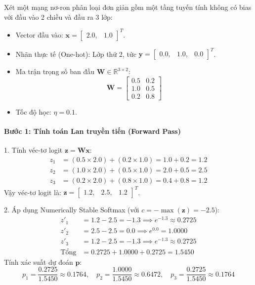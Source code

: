 \begin{example}
Xét một mạng nơ-ron phân loại đơn giản gồm một tầng tuyến tính không có bias với đầu vào 2 chiều và đầu ra 3 lớp:
\begin{itemize}
  \item Vector đầu vào: $\mathbf{x} = \begin{bmatrix} 2.0, & 1.0 \end{bmatrix}^T$.
  \item Nhãn thực tế (One-hot): Lớp thứ 2, tức $\mathbf{y} = \begin{bmatrix} 0.0, & 1.0, & 0.0 \end{bmatrix}^T$.
  \item Ma trận trọng số ban đầu $\mathbf{W} \in \mathbb{R}^{3 \times 2}$:
  \begin{equation*}
  \mathbf{W} = \begin{bmatrix} 0.5 & 0.2 \\ 1.0 & 0.5 \\ 0.2 & 0.8 \end{bmatrix}
  \end{equation*}
  \item Tốc độ học: $\eta = 0.1$.
\end{itemize}

\paragraph{Bước 1: Tính toán Lan truyền tiến (Forward Pass)}
1. Tính véc-tơ logit $\mathbf{z} = \mathbf{W} \mathbf{x}$:
\begin{align*}
z_1 &= (0.5 \times 2.0) + (0.2 \times 1.0) = 1.0 + 0.2 = 1.2 \\
z_2 &= (1.0 \times 2.0) + (0.5 \times 1.0) = 2.0 + 0.5 = 2.5 \\
z_3 &= (0.2 \times 2.0) + (0.8 \times 1.0) = 0.4 + 0.8 = 1.2
\end{align*}
Vậy véc-tơ logit là: $\mathbf{z} = \begin{bmatrix} 1.2, & 2.5, & 1.2 \end{bmatrix}^T$.

2. Áp dụng Numerically Stable Softmax (với $c = -\max(\mathbf{z}) = -2.5$):
\begin{align*}
z'_1 &= 1.2 - 2.5 = -1.3 \implies e^{-1.3} \approx 0.2725 \\
z'_2 &= 2.5 - 2.5 = 0.0 \implies e^{0.0} = 1.0000 \\
z'_3 &= 1.2 - 2.5 = -1.3 \implies e^{-1.3} \approx 0.2725 \\
\text{Tổng} &= 0.2725 + 1.0000 + 0.2725 = 1.5450
\end{align*}
Tính xác suất dự đoán $\mathbf{p}$:
\begin{equation*}
p_1 = \frac{0.2725}{1.5450} \approx 0.1764, \quad p_2 = \frac{1.0000}{1.5450} \approx 0.6472, \quad p_3 = \frac{0.2725}{1.5450} \approx 0.1764
\end{equation*}


\end{example}
